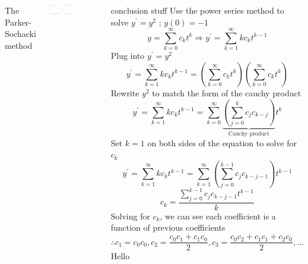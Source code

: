 \documentclass[25pt, a0paper, portrait]{tikzposter}
\begin{document}
\begin{columns}
    {
        The Parker-Sochacki method 
    }  
    {
        \begin{tikzfigure}
        \includegraphics[width=0.22\textwidth]{images/PSM5 TS1 Plot.png}
        \hspace*{1.3cm}
        \includegraphics[width=0.22\textwidth]{images/PSM5 TS10 Plot.png}    
        \end{tikzfigure}
    }
    {
        conclusion stuff
    }
    {
        Use the power series method to solve $y^\prime = y^2$ ; $y(0) = -1$
        \begin{equation*}
            y = \sum\limits_{k=0}^{\infty}c_kt^k \Rightarrow y^\prime = \sum\limits_{k=1}^{\infty}kc_kt^{k-1}
        \end{equation*}
        Plug into $y^\prime = y^2$
        \begin{equation*}
            y^\prime = \sum\limits_{k=1}^{\infty}kc_kt^{k-1} = \left(\sum\limits_{k=0}^{\infty}c_kt^k\right) \left(\sum\limits_{k=0}^{\infty}c_kt^k\right)
        \end{equation*}
        Rewrite $y^2$ to match the form of the cauchy product
        \begin{equation}
            y^\prime = \sum\limits_{k=1}^{\infty}kc_kt^{k-1} = \sum\limits_{k=0}^{\infty} \underbrace{\left(\sum\limits_{j=0}^{k}c_jc_{k-j}\right)}_{\text{Cauchy product}}t^k
        \end{equation}
        Set $k = 1$ on both sides of the equation to solve for $c_k$
        \begin{equation*}
            y^\prime = \sum\limits_{k=1}^{\infty}kc_kt^{k-1} = \sum\limits_{k=1}^{\infty} \left(\sum\limits_{j=0}^{k-1}c_jc_{k-j-1}\right)t^{k-1}
        \end{equation*}
        \begin{equation}
            c_k = \frac{\sum\limits_{j=0}^{k-1}c_jc_{k-j-1}t^{k-1}}{k}
        \end{equation}
        Solving for $c_k$, we can see each coefficient is a function of previous coefficients
        \begin{equation*}
            \therefore c_1 = c_0c_0, c_2 = \frac{c_0c_1 + c_1c_0}{2}, c_3 = \frac{c_0c_2 + c_1c_1+ c_2c_0}{2},\dots
        \end{equation*}
    }
    {
        Hello
    }
\end{columns}
\end{document}
